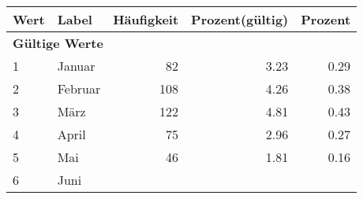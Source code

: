      \begin{longtable}{lXrrr}
     \toprule
     \textbf{Wert} & \textbf{Label} & \textbf{Häufigkeit} & \textbf{Prozent(gültig)} & \textbf{Prozent} \\
     \endhead
     \midrule
     \multicolumn{5}{l}{\textbf{Gültige Werte}}\\

     1 &
     \multicolumn{1}{X}{ Januar   } &


       \num{82} &
       \num[round-mode=places,round-precision=2]{3,23} &
         \num[round-mode=places,round-precision=2]{0,29} \\

     2 &
     \multicolumn{1}{X}{ Februar   } &


       \num{108} &
       \num[round-mode=places,round-precision=2]{4,26} &
         \num[round-mode=places,round-precision=2]{0,38} \\

     3 &
     \multicolumn{1}{X}{ März   } &


       \num{122} &
       \num[round-mode=places,round-precision=2]{4,81} &
         \num[round-mode=places,round-precision=2]{0,43} \\

     4 &
     \multicolumn{1}{X}{ April   } &


       \num{75} &
       \num[round-mode=places,round-precision=2]{2,96} &
         \num[round-mode=places,round-precision=2]{0,27} \\

     5 &
     \multicolumn{1}{X}{ Mai   } &


       \num{46} &
       \num[round-mode=places,round-precision=2]{1,81} &
         \num[round-mode=places,round-precision=2]{0,16} \\

     6 &
     \multicolumn{1}{X}{ Juni   } &



\end{longtable}
